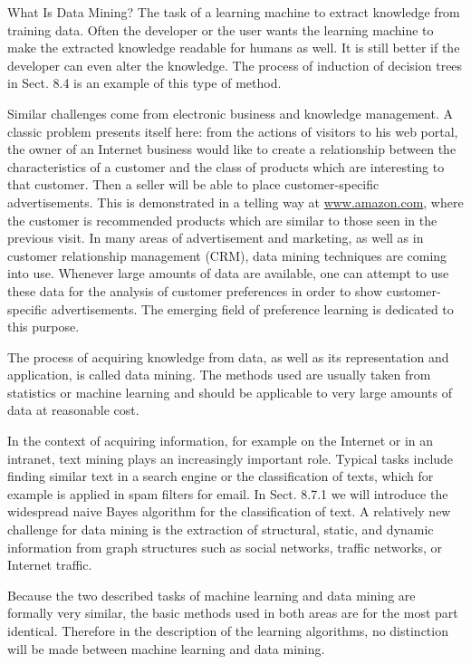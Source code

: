 \documentclass[10pt]{article}
\begin{document}
What Is Data Mining? The task of a learning machine to extract knowledge from training data. Often the developer or the user wants the learning machine to make the extracted knowledge readable for humans as well. It is still better if the\\
developer can even alter the knowledge. The process of induction of decision trees in Sect. 8.4 is an example of this type of method.

Similar challenges come from electronic business and knowledge management. A classic problem presents itself here: from the actions of visitors to his web portal, the owner of an Internet business would like to create a relationship between the characteristics of a customer and the class of products which are interesting to that customer. Then a seller will be able to place customer-specific advertisements. This is demonstrated in a telling way at \href{http://www.amazon.com}{www.amazon.com}, where the customer is recommended products which are similar to those seen in the previous visit. In many areas of advertisement and marketing, as well as in customer relationship management (CRM), data mining techniques are coming into use. Whenever large amounts of data are available, one can attempt to use these data for the analysis of customer preferences in order to show customer-specific advertisements. The emerging field of preference learning is dedicated to this purpose.

\begin{displayquote}
The process of acquiring knowledge from data, as well as its representation and application, is called data mining. The methods used are usually taken from statistics or machine learning and should be applicable to very large amounts of data at reasonable cost.
\end{displayquote}

In the context of acquiring information, for example on the Internet or in an intranet, text mining plays an increasingly important role. Typical tasks include finding similar text in a search engine or the classification of texts, which for example is applied in spam filters for email. In Sect. 8.7.1 we will introduce the widespread naive Bayes algorithm for the classification of text. A relatively new challenge for data mining is the extraction of structural, static, and dynamic information from graph structures such as social networks, traffic networks, or Internet traffic.

Because the two described tasks of machine learning and data mining are formally very similar, the basic methods used in both areas are for the most part identical. Therefore in the description of the learning algorithms, no distinction will be made between machine learning and data mining.
\end{document}
